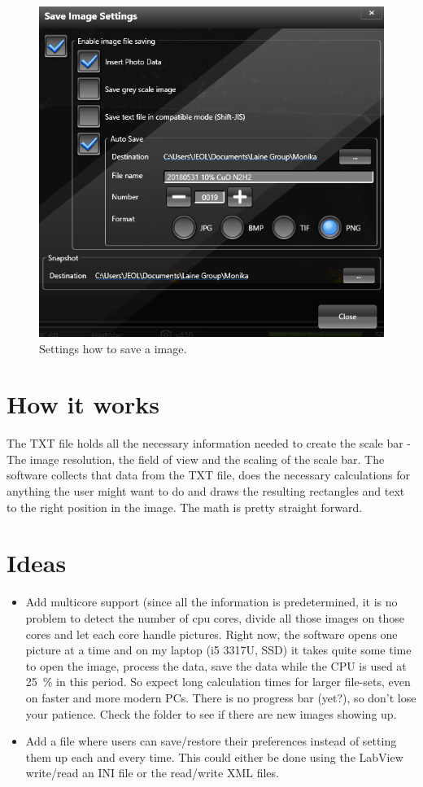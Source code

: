 \documentclass[english]{scrartcl}
\begin{document}
\begin{figure}[htbp]
	\centering
	\includegraphics[width=.6\textwidth]{manual_2}
	\caption{Settings how to save a image.}
	\label{fig:manual_2}
\end{figure}

\section{How it works}
The TXT file holds all the necessary information needed to create the scale bar - The image resolution, the field of view and the scaling of the scale bar.
The software collects that data from the TXT file, does the necessary calculations for anything the user might want to do and draws the resulting rectangles and text to the right position in the image. The math is pretty straight forward.
\section*{Ideas}
\begin{itemize}
	\item Add multicore support (since all the information is predetermined, it is no problem to detect the number of cpu cores, divide all those images on those cores and let each core handle pictures. Right now, the software opens one picture at a time and on my laptop (i5 3317U, SSD) it takes quite some time to open the image, process the data, save the data while the CPU is used at \SI{25}{\percent} in this period. So expect long calculation times for larger file-sets, even on faster and more modern PCs. There is no progress bar (yet?), so don't lose your patience. Check the folder to see if there are new images showing up.
	\item Add a file where users can save/restore their preferences instead of setting them up each and every time. This could either be done using the LabView write/read an INI file or the read/write XML files.
\end{itemize}
\end{document}
